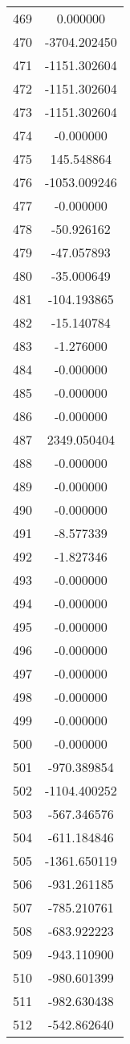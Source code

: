 \documentclass[12pt]{article}
\begin{document}
\begin{longtable}{@{}cc@{}}
469 & 0.000000 \\
470 & -3704.202450 \\
471 & -1151.302604 \\
472 & -1151.302604 \\
473 & -1151.302604 \\
474 & -0.000000 \\
475 & 145.548864 \\
476 & -1053.009246 \\
477 & -0.000000 \\
478 & -50.926162 \\
479 & -47.057893 \\
480 & -35.000649 \\
481 & -104.193865 \\
482 & -15.140784 \\
483 & -1.276000 \\
484 & -0.000000 \\
485 & -0.000000 \\
486 & -0.000000 \\
487 & 2349.050404 \\
488 & -0.000000 \\
489 & -0.000000 \\
490 & -0.000000 \\
491 & -8.577339 \\
492 & -1.827346 \\
493 & -0.000000 \\
494 & -0.000000 \\
495 & -0.000000 \\
496 & -0.000000 \\
497 & -0.000000 \\
498 & -0.000000 \\
499 & -0.000000 \\
500 & -0.000000 \\
501 & -970.389854 \\
502 & -1104.400252 \\
503 & -567.346576 \\
504 & -611.184846 \\
505 & -1361.650119 \\
506 & -931.261185 \\
507 & -785.210761 \\
508 & -683.922223 \\
509 & -943.110900 \\
510 & -980.601399 \\
511 & -982.630438 \\
512 & -542.862640 \\

\end{longtable}
\end{document}
